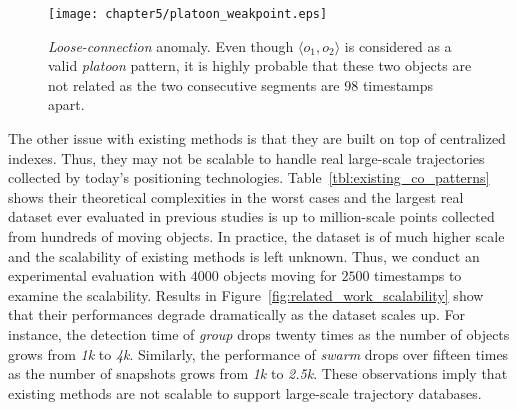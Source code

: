 \begin{figure}[h]
\center
\texttt{[image: chapter5/platoon\_weakpoint.eps]}
\caption{\emph{Loose-connection} anomaly. Even though $\langle o_1, o_2\rangle$ is considered as a valid \emph{platoon} pattern, it is highly probable that these two objects are not related as the two consecutive segments  are 98 timestamps apart. 
}
\label{fig:platoon_weakpoint}
\end{figure}



The other issue with existing methods is that they are built on top of centralized indexes. Thus, they may not be scalable to handle real large-scale trajectories collected by today's
positioning technologies.
%
%
Table~\ref{tbl:existing_co_patterns} shows their theoretical complexities in the worst cases and the largest real dataset ever evaluated in previous studies is up to million-scale points collected from hundreds of moving objects. In practice, the dataset is of much higher scale and the scalability of existing methods is left unknown. Thus, we conduct an experimental evaluation with $4000$ objects moving for $2500$ timestamps to examine the scalability. Results in Figure~\ref{fig:related_work_scalability} show that their performances degrade dramatically as the dataset scales up. For instance, the detection time of \emph{group} drops twenty times as the number of objects grows from \emph{1k} to \emph{4k}. Similarly,
the performance of \emph{swarm} drops over fifteen times as the number of snapshots grows from \emph{1k} to \emph{2.5k}.
These observations imply that existing methods are not scalable to support large-scale trajectory databases. 


